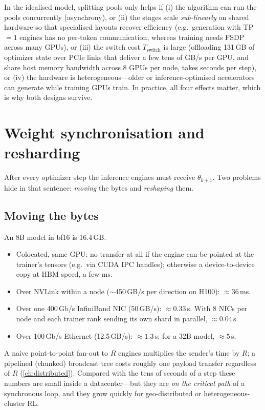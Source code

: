 \begin{systemslens}
In the idealised model, splitting pools only helps if (i) the algorithm can run the pools
concurrently (asynchrony), or (ii) the stages scale \emph{sub-linearly} on shared hardware so
that specialised layouts recover efficiency (e.g.\ generation with TP$=1$ engines has no
per-token communication, whereas training needs FSDP across many GPUs), or (iii) the switch
cost $T_{\text{switch}}$ is large (offloading 131\,GB of optimizer state over PCIe links that deliver a few tens of GB/s per GPU,
and share host memory bandwidth across 8 GPUs per node, takes seconds per step), or (iv) the hardware is
heterogeneous---older or inference-optimised accelerators can generate while training GPUs
train. In practice, all four effects matter, which is why both designs survive.
\end{systemslens}

\section{Weight synchronisation and resharding}\label{sec:rlsys:sync}

After every optimizer step the inference engines must receive $\theta_{k+1}$. Two problems
hide in that sentence: \emph{moving} the bytes and \emph{reshaping} them.

\subsection{Moving the bytes}

\begin{napkinmath}
An 8B model in bf16 is 16.4\,GB.
\begin{itemize}
\item Colocated, same GPU: no transfer at all if the engine can be pointed at the trainer's
tensors (e.g.\ via CUDA IPC handles); otherwise a device-to-device copy at HBM speed, a few ms.
\item Over NVLink within a node ($\sim$450\,GB/s per direction on H100): $\approx 36$\,ms.
\item Over one 400\,Gb/s InfiniBand NIC (50\,GB/s): $\approx 0.33$\,s. With 8 NICs per node
and each trainer rank sending its own shard in parallel, $\approx 0.04$\,s.
\item Over 100\,Gb/s Ethernet (12.5\,GB/s): $\approx 1.3$\,s; for a 32B model, $\approx 5$\,s.
\end{itemize}
A naive point-to-point fan-out to $R$ engines multiplies the sender's time by $R$; a
pipelined (chunked) broadcast tree costs roughly one payload transfer regardless of $R$
(\cref{ch:distributed}). Compared with the tens of seconds of a step these numbers are small
inside a datacenter---but they are \emph{on the critical path} of a synchronous loop, and
they grow quickly for geo-distributed or heterogeneous-cluster RL.
\end{napkinmath}

